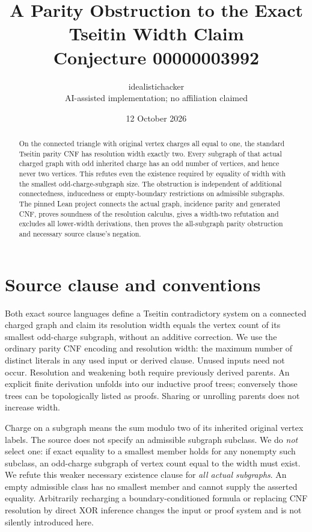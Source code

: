 \documentclass[10pt,a4paper]{article}
\title{A Parity Obstruction to the Exact Tseitin Width Claim\\Conjecture 00000003992}
\author{idealistichacker\\\small AI-assisted implementation; no affiliation claimed}
\date{12 October 2026}
\begin{document}
\maketitle
\begin{abstract}
On the connected triangle with original vertex charges all equal to one, the standard Tseitin
parity CNF has resolution width exactly two. Every subgraph of that actual charged graph with
odd inherited charge has an odd number of vertices, and hence never two vertices. This refutes
even the existence required by equality of width with the smallest odd-charge-subgraph size.
The obstruction is independent of additional connectedness, inducedness or empty-boundary
restrictions on admissible subgraphs. The pinned Lean project connects the actual graph,
incidence parity and generated CNF, proves soundness of the resolution calculus, gives a
width-two refutation and excludes all lower-width derivations, then proves the all-subgraph
parity obstruction and necessary source clause's negation.
\end{abstract}

\section{Source clause and conventions}
Both exact source languages define a Tseitin contradictory system on a connected charged
graph and claim its resolution width equals the vertex count of its smallest odd-charge
subgraph, without an additive correction. We use the ordinary parity CNF encoding and
resolution width: the maximum number of distinct literals in any used input or derived clause.
Unused inputs need not occur. Resolution and weakening both require previously derived parents.
An explicit finite derivation unfolds into our inductive proof trees; conversely those trees
can be topologically listed as proofs. Sharing or unrolling parents does not increase width.

Charge on a subgraph means the sum modulo two of its inherited original vertex labels.
The source does not specify an admissible subgraph subclass. We do \emph{not} select one:
if exact equality to a smallest member holds for any nonempty such subclass, an odd-charge
subgraph of vertex count equal to the width must exist. We refute this weaker necessary
existence clause for \emph{all actual subgraphs}. An empty admissible class has no smallest
member and cannot supply the asserted equality. Arbitrarily recharging a boundary-conditioned
formula or replacing CNF resolution by direct XOR inference changes the input or proof system
and is not silently introduced here.
\end{document}
